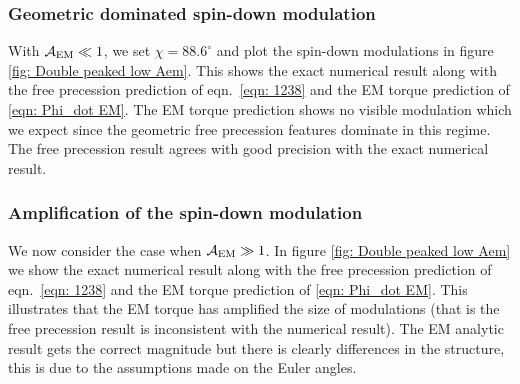 \documentclass[/home/greg/Thesis/main/main.tex]{subfiles}
\begin{document}
\subsubsection{Geometric dominated spin-down modulation}
With $\mathcal{A}_{\mathrm{EM}} \ll 1$, we set $\chi=88.6^{\circ}$ and plot the spin-down modulations
in figure \ref{fig: Double peaked low Aem}. This shows the exact numerical 
result along with the free precession prediction of eqn.~\eqref{eqn: 1238} and
the EM torque prediction of \eqref{eqn: Phi_dot EM}. The EM torque 
prediction shows no visible modulation which we expect since the geometric 
free precession features dominate in this regime. The free precession result
agrees with good precision with the exact numerical result.
\begin{figure}[htb]
\begin{floatrow}
\capbtabbox{%
    
}{%
  \caption{}%
  \label{tab:}
}
\end{floatrow}
\end{figure}

\subsubsection{Amplification of the spin-down modulation}

We now consider the case when $\mathcal{A}_{\mathrm{EM}} \gg 1$. In figure \ref{fig: Double peaked
low Aem} we show the exact numerical result along with the free precession
prediction of eqn.~\eqref{eqn: 1238} and the EM torque prediction of
\eqref{eqn: Phi_dot EM}. This illustrates that the EM torque has amplified
the size of modulations (that is the free precession result is inconsistent
with the numerical result). The EM analytic result gets the correct magnitude
but there is clearly differences in the structure, this is due to the assumptions
made on the Euler angles.

\begin{figure}[htb]
\begin{floatrow}
\capbtabbox{%
    
}{%
  \caption{}%
  \label{tab:}
}
\end{floatrow}
\end{figure}





\biblio
\end{document}
